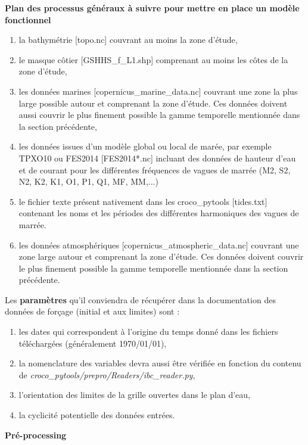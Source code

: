 \documentclass[10pt,a4paper,titlepage]{article}
\begin{document}
\begin{processEnv}{\textbf{Plan des processus généraux à suivre pour mettre en place un modèle fonctionnel}}
    \begin{enumerate}
        \item la bathymétrie {\color{darkgrey}[topo.nc]} couvrant au moins la zone d'étude,
        \item le masque côtier {\color{darkgrey}[GSHHS\_f\_L1.shp]} comprenant au moins les côtes de la zone d'étude,
        \item les données marines {\color{darkgrey}[copernicus\_marine\_data.nc]} couvrant une zone la plus large possible autour et comprenant la zone d'étude. Ces données doivent aussi couvrir le plus finement possible la gamme temporelle mentionnée dans la section précédente,
        \item les données issues d'un modèle global ou local de marée, par exemple TPXO10 ou FES2014 {\color{darkgrey}[FES2014*.nc]} incluant des données de hauteur d'eau et de courant pour les différentes fréquences de vagues de marrée (M2, S2, N2, K2, K1, O1, P1, Q1, MF, MM,...)
        \item le fichier texte présent nativement dans les croco\_pytools {\color{darkgrey}[tides.txt]} contenant les noms et les périodes des différentes harmoniques des vagues de marrée.
        \item les données atmosphériques {\color{darkgrey}[copernicus\_atmospheric\_data.nc]} couvrant une zone large autour et comprenant la zone d'étude. Ces données doivent couvrir le plus finement possible la gamme temporelle mentionnée dans la section précédente.
    \end{enumerate}

    Les {\color{paramColor}\textbf{paramètres}} qu'il conviendra de récupérer dans la documentation des données de forçage (initial et aux limites) sont :

    \begin{enumerate}
        \item les dates qui correspondent à l'origine du temps donné dans les fichiers téléchargées (généralement 1970/01/01),
        \item la nomenclature des variables devra aussi être vérifiée en fonction du contenu de \textit{croco\_pytools/prepro/Readers/ibc\_reader.py},
        \item l'orientation des limites de la grille ouvertes dans le plan d'eau,
        \item la cyclicité potentielle des données entrées.
    \end{enumerate}

    {\color{workColor}\textbf{Pré-processing}}


\end{processEnv}
\end{document}
